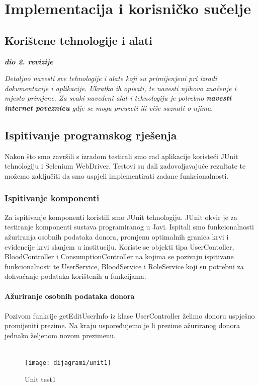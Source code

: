 \chapter{Implementacija i korisničko sučelje}
		
		
		\section{Korištene tehnologije i alati}
		
			\textbf{\textit{dio 2. revizije}}
			
			 \textit{Detaljno navesti sve tehnologije i alate koji su primijenjeni pri izradi dokumentacije i aplikacije. Ukratko ih opisati, te navesti njihovo značenje i mjesto primjene. Za svaki navedeni alat i tehnologiju je potrebno \textbf{navesti internet poveznicu} gdje se mogu preuzeti ili više saznati o njima}.
			
			
			\eject 
		
	
		\section{Ispitivanje programskog rješenja}
			
Nakon što smo završili s izradom testirali smo rad aplikacije koristeći JUnit tehnologiju i
Selenium WebDriver. Testovi su dali zadovoljavajuće rezultate te možemo zaključiti da smo uspjeli implementirati zadane funkcionalnosti.
			
			\subsection{Ispitivanje komponenti}
			
Za ispitivanje komponenti koristili smo JUnit tehnologiju. JUnit okvir je za testiranje komponenti sustava programiranog u Javi. Ispitali smo funkcionalnosti ažuriranja osobnih podataka donora, promjenu optimalnih granica krvi i evidencije krvi slanjem u instituciju. Koriste se objekti tipa UserContoller, BloodController i ConsumptionController na kojima se pozivaju ispitivane funkcionalnosti te UserService, BloodService i RoleService koji su potrebni za dohvaćanje podataka korištenih u funkcijama.
\\\\
\textbf{Ažuriranje osobnih podataka donora}
\\\\
Pozivom funkcije getEditUserInfo iz klase UserController želimo donoru uspješno promijeniti prezime. Na kraju uspoređujemo je li prezime ažuriranog donora jednako željenom novom prezimenu.
\\\\
\begin{figure}[H]
	\centering
	\texttt{[image: dijagrami/unit1]}
	\caption{Unit test1}
\end{figure}
	
